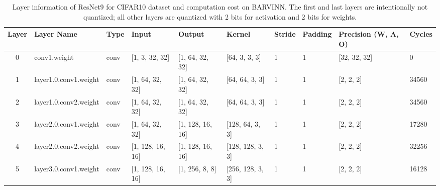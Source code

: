\documentclass[sigconf]{acmart}
\begin{document}
\iffalse
\begin{table*}[]
\caption{Layer information of ResNet9 for CIFAR10 dataset and computation cost on BARVINN. The first and last layers are intentionally not quantized; all other layers are quantized with 2 bits for activation and 2 bits for weights.}
\begin{tabular}{clllllll|l|l|}
\hline
\multicolumn{1}{|c|}{Layer} & \multicolumn{1}{l|}{Layer Name}            & \multicolumn{1}{l|}{Type}   & \multicolumn{1}{l|}{Input}                & \multicolumn{1}{l|}{Output}               & \multicolumn{1}{l|}{Kernel}               & \multicolumn{1}{l|}{Stride}     & Padding          & Precision (W, A, O)        & Cycles \\ \hline\hline
\multicolumn{1}{|c|}{0}            & \multicolumn{1}{l|}{conv1.weight}          & \multicolumn{1}{l|}{conv}   & \multicolumn{1}{l|}{{[}1, 3, 32, 32{]}}   & \multicolumn{1}{l|}{{[}1, 64, 32, 32{]}}  & \multicolumn{1}{l|}{{[}64, 3, 3, 3{]}}    & \multicolumn{1}{l|}{1} & 1 & {[}32, 32, 32{]} & 0      \\ \hline
\multicolumn{1}{|c|}{1}            & \multicolumn{1}{l|}{layer1.0.conv1.weight} & \multicolumn{1}{l|}{conv}   & \multicolumn{1}{l|}{{[}1, 64, 32, 32{]}}  & \multicolumn{1}{l|}{{[}1, 64, 32, 32{]}}  & \multicolumn{1}{l|}{{[}64, 64, 3, 3{]}}   & \multicolumn{1}{l|}{1} & 1 & {[}2, 2, 2{]}    & 34560  \\ \hline
\multicolumn{1}{|c|}{2}            & \multicolumn{1}{l|}{layer1.0.conv2.weight} & \multicolumn{1}{l|}{conv}   & \multicolumn{1}{l|}{{[}1, 64, 32, 32{]}}  & \multicolumn{1}{l|}{{[}1, 64, 32, 32{]}}  & \multicolumn{1}{l|}{{[}64, 64, 3, 3{]}}   & \multicolumn{1}{l|}{1} & 1 & {[}2, 2, 2{]}    & 34560  \\ \hline
\multicolumn{1}{|c|}{3}            & \multicolumn{1}{l|}{layer2.0.conv1.weight} & \multicolumn{1}{l|}{conv}   & \multicolumn{1}{l|}{{[}1, 64, 32, 32{]}}  & \multicolumn{1}{l|}{{[}1, 128, 16, 16{]}} & \multicolumn{1}{l|}{{[}128, 64, 3, 3{]}}  & \multicolumn{1}{l|}{1} & 1 & {[}2, 2, 2{]}    & 17280  \\ \hline
\multicolumn{1}{|c|}{4}            & \multicolumn{1}{l|}{layer2.0.conv2.weight} & \multicolumn{1}{l|}{conv}   & \multicolumn{1}{l|}{{[}1, 128, 16, 16{]}} & \multicolumn{1}{l|}{{[}1, 128, 16, 16{]}} & \multicolumn{1}{l|}{{[}128, 128, 3, 3{]}} & \multicolumn{1}{l|}{1} & 1 & {[}2, 2, 2{]}    & 32256  \\ \hline
\multicolumn{1}{|c|}{5}            & \multicolumn{1}{l|}{layer3.0.conv1.weight} & \multicolumn{1}{l|}{conv}   & \multicolumn{1}{l|}{{[}1, 128, 16, 16{]}} & \multicolumn{1}{l|}{{[}1, 256, 8, 8{]}}   & \multicolumn{1}{l|}{{[}256, 128, 3, 3{]}} & \multicolumn{1}{l|}{1} & 1 & {[}2, 2, 2{]}    & 16128  \\ \hline

\end{tabular}
\end{table*}
\end{document}
